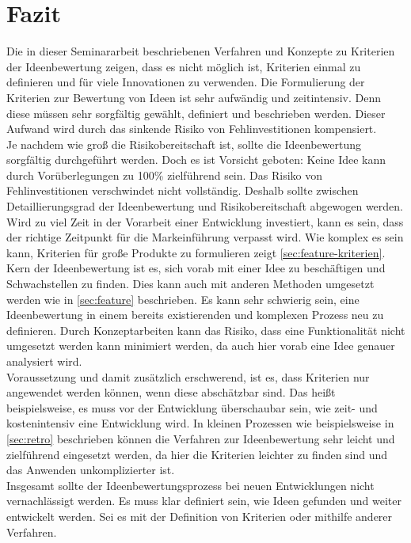 \section{Fazit}\label{sec:fazit}
Die in dieser Seminararbeit beschriebenen Verfahren und Konzepte zu Kriterien der Ideenbewertung zeigen, dass
es nicht möglich ist, Kriterien einmal zu definieren und für viele Innovationen zu verwenden. Die Formulierung der Kriterien
zur Bewertung von Ideen ist sehr aufwändig und zeitintensiv. Denn diese müssen sehr sorgfältig gewählt, definiert und beschrieben 
werden. Dieser Aufwand wird durch das sinkende Risiko von Fehlinvestitionen kompensiert.\\ 
Je nachdem wie groß die Risikobereitschaft ist, sollte die Ideenbewertung sorgfältig durchgeführt werden. 
Doch es ist Vorsicht geboten: Keine Idee kann durch Vorüberlegungen zu 100\% zielführend sein. Das Risiko von 
Fehlinvestitionen verschwindet nicht vollständig. Deshalb sollte zwischen Detaillierungsgrad der Ideenbewertung 
und Risikobereitschaft abgewogen werden. Wird zu viel Zeit in der Vorarbeit einer Entwicklung investiert, kann es sein, dass
der richtige Zeitpunkt für die Markeinführung verpasst wird. Wie komplex es sein kann, Kriterien für große Produkte zu formulieren 
zeigt \autoref{sec:feature-kriterien}.\\
Kern der Ideenbewertung ist es, sich vorab mit einer Idee zu beschäftigen und Schwachstellen zu finden. Dies 
kann auch mit anderen Methoden umgesetzt werden wie in \autoref{sec:feature} beschrieben. Es kann sehr schwierig sein, 
eine Ideenbewertung in einem bereits existierenden und komplexen Prozess neu zu definieren. Durch Konzeptarbeiten kann 
das Risiko, dass eine Funktionalität nicht umgesetzt werden kann minimiert werden, da auch hier vorab eine Idee genauer 
analysiert wird. \\
Voraussetzung und damit zusätzlich erschwerend, ist es, dass Kriterien nur angewendet werden können, wenn diese abschätzbar sind. 
Das heißt beispielsweise, es muss vor der Entwicklung überschaubar sein, wie zeit- und kostenintensiv eine Entwicklung wird. 
In kleinen Prozessen wie beispielsweise in \autoref{sec:retro} beschrieben können die Verfahren zur Ideenbewertung sehr leicht und 
zielführend eingesetzt werden, da hier die Kriterien leichter zu finden sind und das Anwenden unkomplizierter ist. \\
Insgesamt sollte der Ideenbewertungsprozess bei neuen Entwicklungen nicht vernachlässigt werden. Es muss klar definiert sein, wie
Ideen gefunden und weiter entwickelt werden. Sei es mit der Definition von Kriterien oder mithilfe anderer Verfahren. 